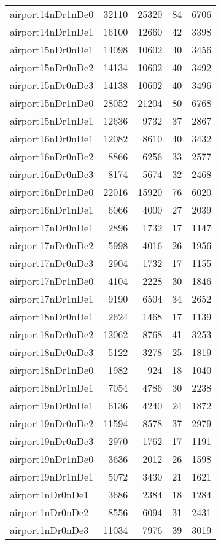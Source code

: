 \begin{tabular}{lrrrr}
airport14nDr1nDe0 & 32110 & 25320 & 84 & 6706 \\
airport14nDr1nDe1 & 16100 & 12660 & 42 & 3398 \\
airport15nDr0nDe1 & 14098 & 10602 & 40 & 3456 \\
airport15nDr0nDe2 & 14134 & 10602 & 40 & 3492 \\
airport15nDr0nDe3 & 14138 & 10602 & 40 & 3496 \\
airport15nDr1nDe0 & 28052 & 21204 & 80 & 6768 \\
airport15nDr1nDe1 & 12636 & 9732 & 37 & 2867 \\
airport16nDr0nDe1 & 12082 & 8610 & 40 & 3432 \\
airport16nDr0nDe2 & 8866 & 6256 & 33 & 2577 \\
airport16nDr0nDe3 & 8174 & 5674 & 32 & 2468 \\
airport16nDr1nDe0 & 22016 & 15920 & 76 & 6020 \\
airport16nDr1nDe1 & 6066 & 4000 & 27 & 2039 \\
airport17nDr0nDe1 & 2896 & 1732 & 17 & 1147 \\
airport17nDr0nDe2 & 5998 & 4016 & 26 & 1956 \\
airport17nDr0nDe3 & 2904 & 1732 & 17 & 1155 \\
airport17nDr1nDe0 & 4104 & 2228 & 30 & 1846 \\
airport17nDr1nDe1 & 9190 & 6504 & 34 & 2652 \\
airport18nDr0nDe1 & 2624 & 1468 & 17 & 1139 \\
airport18nDr0nDe2 & 12062 & 8768 & 41 & 3253 \\
airport18nDr0nDe3 & 5122 & 3278 & 25 & 1819 \\
airport18nDr1nDe0 & 1982 & 924 & 18 & 1040 \\
airport18nDr1nDe1 & 7054 & 4786 & 30 & 2238 \\
airport19nDr0nDe1 & 6136 & 4240 & 24 & 1872 \\
airport19nDr0nDe2 & 11594 & 8578 & 37 & 2979 \\
airport19nDr0nDe3 & 2970 & 1762 & 17 & 1191 \\
airport19nDr1nDe0 & 3636 & 2012 & 26 & 1598 \\
airport19nDr1nDe1 & 5072 & 3430 & 21 & 1621 \\
airport1nDr0nDe1 & 3686 & 2384 & 18 & 1284 \\
airport1nDr0nDe2 & 8556 & 6094 & 31 & 2431 \\
airport1nDr0nDe3 & 11034 & 7976 & 39 & 3019 \\

\end{tabular}
